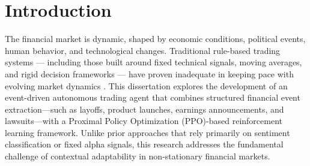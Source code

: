 \documentclass[a4paper,fleqn]{cas-sc}
\begin{document}
\maketitle
\section{Introduction}\label{sec:intro}
The financial market is dynamic, shaped by economic conditions, political events, human behavior, and technological changes. Traditional rule-based trading systems — including those built around fixed technical signals, moving averages, and rigid decision frameworks — have proven inadequate in keeping pace with evolving market dynamics \cite{smith2024trading} . This dissertation explores the development of an event-driven autonomous trading agent that combines structured financial event extraction—such as layoffs, product launches, earnings announcements, and lawsuits—with a Proximal Policy Optimization (PPO)-based reinforcement learning framework. Unlike prior approaches that rely primarily on sentiment classification or fixed alpha signals, this research addresses the fundamental challenge of contextual adaptability in non-stationary financial markets.
\end{document}

